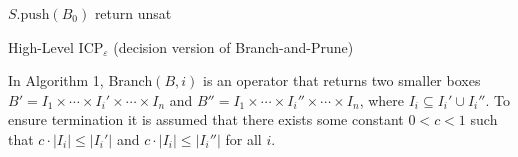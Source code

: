 \documentclass[envcountsect]{llncs}
\begin{document}
\begin{algorithm}\label{algo1}
\BlankLine
$S.\mathrm{push}(B_0)$\;
\While{$S\neq \emptyset$}{\label{while}
$B\leftarrow S.\mathrm{pop}()$ \;
\While{$\exists 1\leq i \leq m, B\neq \mathrm{Prune}(B,f_i)$}{ 
	$B\leftarrow\mathrm{Prune}(B, f_i)$ \;
}
\If{$B\neq \emptyset$}
{\eIf{$\exists 1\leq i\leq n, |I_i|\geq \varepsilon$}{$\{B_1,B_2\}\leftarrow \mathrm{Branch}(B, i)$\;$S.\mathrm{push}(\{B_1,B_2\})$\;}{return {\sf sat}\;}}
}
return {\sf unsat}\;
\caption{High-Level ICP$_{\varepsilon}$ (decision version of Branch-and-Prune)}
\end{algorithm}
In Algorithm 1, Branch$(B,i)$ is an operator that returns two smaller boxes $B' = I_1\times\cdots\times I_i'\times\cdots\times I_n$ and $B''=I_1\times \cdots\times I_i''\times \cdots\times I_n$, where $I_i\subseteq I_i'\cup I_i''$. To ensure termination it is assumed that there exists some constant $0<c<1$ such that $c\cdot |I_i|\leq |I_i'|$ and $c\cdot |I_i|\leq |I_i''|$ for all $i$.

\end{document}
